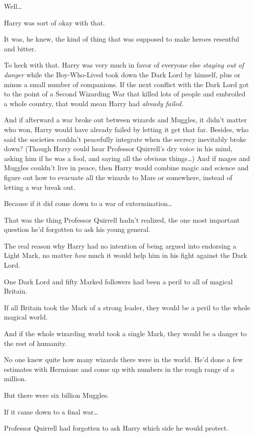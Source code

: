 Well{\ldots}

Harry was sort of okay with that.

It was, he knew, the kind of thing that was supposed to make heroes resentful 
and bitter.

To heck with that. Harry was very much in favor of everyone else \emph{staying 
out of danger} while the Boy-Who-Lived took down the Dark Lord by himself, plus 
or minus a small number of companions. If the next conflict with the Dark Lord 
got to the point of a Second Wizarding War that killed lots of people and 
embroiled a whole country, that would mean Harry had \emph{already failed}.

And if afterward a war broke out between wizards and Muggles, it didn't matter 
who won, Harry would have already failed by letting it get that far. Besides, 
who said the societies couldn't peacefully integrate when the secrecy 
inevitably broke down? (Though Harry could hear Professor Quirrell's dry voice 
in his mind, asking him if he was a fool, and saying all the obvious 
things{\ldots}) And if mages and Muggles couldn't live in peace, then Harry 
would combine magic and science and figure out how to evacuate all the wizards 
to Mars or somewhere, instead of letting a war break out.

Because if it did come down to a war of extermination{\ldots}

That was the thing Professor Quirrell hadn't realized, the one most important 
question he'd forgotten to ask his young general.

The real reason why Harry had no intention of being argued into endorsing a 
Light Mark, no matter \emph{how} much it would help him in his fight against 
the Dark Lord.

One Dark Lord and fifty Marked followers had been a peril to all of magical 
Britain.

If all Britain took the Mark of a strong leader, they would be a peril to the 
whole magical world.

And if the whole wizarding world took a single Mark, they would be a danger to 
the rest of humanity.

No one knew quite how many wizards there were in the world. He'd done a few 
estimates with Hermione and come up with numbers in the rough range of a 
million.

But there were six billion Muggles.

If it came down to a final war{\ldots}

Professor Quirrell had forgotten to ask Harry which side he would protect.

